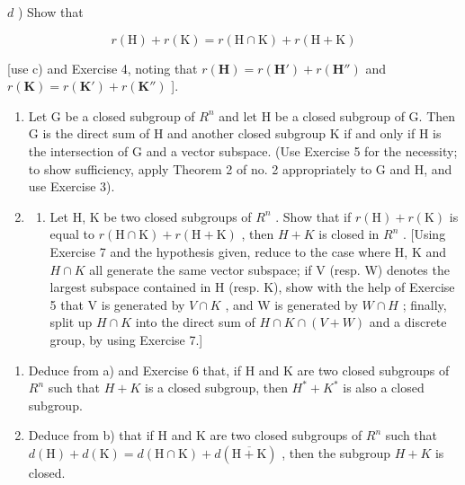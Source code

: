 \(d\) ) Show that

\[
r (\mathrm{H}) + r (\mathrm{K}) = r (\mathrm{H} \cap \mathrm{K}) + r (\mathrm{H} + \mathrm{K})
\]

{[}use c) and Exercise 4, noting that \(r(\mathbf{H}) = r(\mathbf{H}') + r(\mathbf{H}'')\) and \(r(\mathbf{K}) = r(\mathbf{K}') + r(\mathbf{K}'' )\) {]}.

\begin{enumerate}
\def\labelenumi{\arabic{enumi})}
\setcounter{enumi}{6}
\item
  Let G be a closed subgroup of \(R^{n}\) and let H be a closed subgroup of G. Then G is the direct sum of H and another closed subgroup K if and only if H is the intersection of G and a vector subspace. (Use Exercise 5 for the necessity; to show sufficiency, apply Theorem 2 of no. 2 appropriately to G and H, and use Exercise 3).
\item
  \begin{enumerate}
  \def\labelenumii{\alph{enumii})}
  \tightlist
  \item
    Let H, K be two closed subgroups of \(R^{n}\) . Show that if \(r(\mathrm{H}) + r(\mathrm{K})\) is equal to \(r(\mathrm{H} \cap \mathrm{K}) + r(\mathrm{H} + \mathrm{K})\) , then \(H + K\) is closed in \(R^{n}\) . {[}Using Exercise 7 and the hypothesis given, reduce to the case where H, K and \(H \cap K\) all generate the same vector subspace; if V (resp. W) denotes the largest subspace contained in H (resp. K), show with the help of Exercise 5 that V is generated by \(V \cap K\) , and W is generated by \(W \cap H\) ; finally, split up \(H \cap K\) into the direct sum of \(H \cap K \cap (V + W)\) and a discrete group, by using Exercise 7.{]}
  \end{enumerate}
\end{enumerate}

\begin{enumerate}
\def\labelenumi{\alph{enumi})}
\setcounter{enumi}{1}
\item
  Deduce from a) and Exercise 6 that, if H and K are two closed subgroups of \(R^{n}\) such that \(H + K\) is a closed subgroup, then \(H^{*} + K^{*}\) is also a closed subgroup.
\item
  Deduce from b) that if H and K are two closed subgroups of \(R^{n}\) such that \(d(\mathrm{H}) + d(\mathrm{K}) = d(\mathrm{H} \cap \mathrm{K}) + d(\overline{\mathrm{H} + \mathrm{K}})\) , then the subgroup \(H + K\) is closed.
\end{enumerate}


